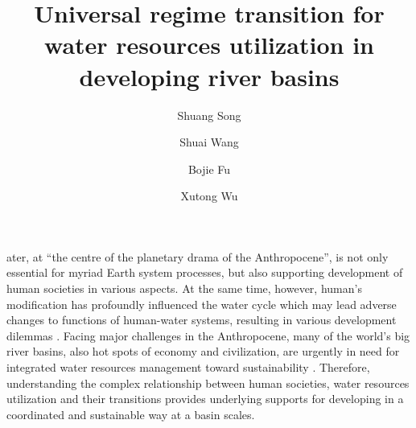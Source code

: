 \documentclass[9pt, twocolumn, twoside, lineno]{pnas-new}
\title{Universal regime transition for water resources utilization in developing river basins}
\author[a, b]{Shuang Song}  %
\author[a, b, 1]{Shuai Wang}  %
\author[a, b]{Bojie Fu}  %
\author[c, d]{Xutong Wu}  %
\affil[a]{ %
	State Key Laboratory of Earth Surface Processes and Resource Ecology, 
	Faculty of Geographical Science, 
	Beijing Normal University, 
	Beijing 100875, 
	P.R. China
}
\affil[b]{ %
	Institute of Land Surface System and Sustainability, 
	Faculty of Geographical Science, 
	Beijing Normal University, 
	Beijing 100875, 
	P.R. China
}
\affil[c]{ %
	College of Urban and Environmental Sciences, 
	Peking University, 
	Beijing 100871, 
	P.R. China
}
\affil[d]{ %
	State Key Laboratory of Urban and Regional Ecology, 
	Research Center for Eco-Environmental Sciences, 
	Chinese Academy of Sciences, 
	Beijing 100085, 
	P.R. China 
}
\begin{document}
\maketitle
\thispagestyle{firststyle}

ater, at “the centre of the planetary drama of the Anthropocene”, is not only essential for myriad Earth system processes, but also supporting development of human societies in various aspects. 
At the same time, however, human's modification has profoundly influenced the water cycle which may lead adverse changes to functions of human-water systems, resulting in various development dilemmas \cite{gleesonIlluminatingWaterCycle2020,cummingLinkingEconomicGrowth2018}.
Facing major challenges in the Anthropocene, many of the world's big river basins, also hot spots of economy and civilization, are urgently in need for integrated water resources management toward sustainability \cite{bestAnthropogenicStressesWorld2019}. 
Therefore, understanding the complex relationship between human societies, water resources utilization and their transitions provides underlying supports for developing in a coordinated and sustainable way at a basin scales.
\end{document}
